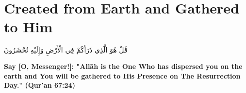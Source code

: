 \chapter{Created from Earth and Gathered to Him}
\begin{center}
    {\Huge    
        \begin{Arabic}
            قُلْ هُوَ الَّذِي ذَرَأَكُمْ فِي الْأَرْضِ وَإِلَيْهِ تُحْشَرُونَ
        \end{Arabic}
    }
\end{center}
\vspace*{\fill}
\vspace{3cm}
\begin{center}
    \large \textbf{Say [O, Messenger!]: "Allāh is the One Who has dispersed you on the earth and You will be gathered to His Presence on The Resurrection Day." (Qur'an 67:24)}
\end{center}
